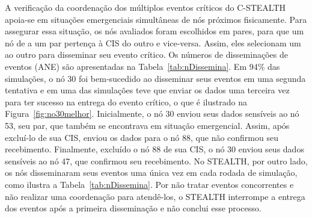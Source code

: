 \documentclass[12pt]{article}
\begin{document}
A verificação da coordenação dos múltiplos eventos críticos
do
\mbox{C-STEALTH} apoia-se em
situações emergenciais
simultâneas de
nós próximos fisicamente. 
Para assegurar essa situação, os nós avaliados foram escolhidos em pares, 
para que
um nó de a um par pertença à CIS do outro e vice-versa. Assim, eles selecionam um ao outro para disseminar seu evento crítico.
Os números de disseminações de eventos (ANE) são apresentadas na
Tabela~\ref{tab:nDissemina}.
Em 94\% das simulações, o nó 30 foi bem-sucedido ao disseminar seus eventos em uma segunda tentativa e em uma das simulações teve que enviar os dados uma terceira vez para ter sucesso na entrega do evento crítico, o que é ilustrado na Figura~\ref{fig:no30melhor}. Inicialmente, o nó 30 enviou seus dados sensíveis ao nó 53, seu par, que também se encontrava em situação emergencial. Assim, após excluí-lo de sua CIS, enviou os dados para o nó 88, que não confirmou seu recebimento. Finalmente, excluído o nó 88 de sua CIS, o nó 30 enviou seus dados sensíveis ao nó 47, que confirmou seu recebimento. No STEALTH, por outro lado, os nós disseminaram seus eventos uma única vez em cada rodada de simulação, como ilustra a Tabela~\ref{tab:nDissemina}. Por não tratar eventos concorrentes e não realizar uma coordenação para atendê-los, o STEALTH interrompe a entrega dos eventos após a primeira disseminação e não conclui esse processo.

\vspace{-0.5cm}
\end{document}
